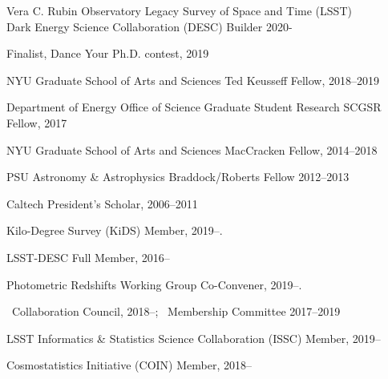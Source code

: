 \documentclass[12pt,letterpaper]{article}
\begin{document}
\begin{list}{}{\malzlist}
\item Vera C. Rubin Observatory Legacy Survey of Space and Time (LSST)\\ Dark Energy Science Collaboration (DESC) Builder 2020-
\item Finalist, Dance Your Ph.D. contest, 2019
\item
NYU Graduate School of Arts and Sciences Ted Keusseff Fellow, 2018--2019
\item
Department of Energy Office of Science Graduate Student Research SCGSR Fellow, 2017
\item
NYU Graduate School of Arts and Sciences MacCracken Fellow, 2014--2018
\item
PSU Astronomy \& Astrophysics Braddock/Roberts Fellow 2012--2013
\item
Caltech President's Scholar, 2006--2011
\end{list}

\begin{list}{}{\malzlist}
	\item Kilo-Degree Survey (KiDS) Member, 2019--.
	\item LSST-DESC Full Member, 2016--\\
	\begin{list}{}{\malzlist}
		\item Photometric Redshifts Working Group Co-Convener, 2019--.
		\item \past\ Collaboration Council, 2018--; \past\ Membership Committee 2017--2019
	\end{list}
	\item LSST Informatics \& Statistics Science Collaboration (ISSC) Member, 2019--
	\item Cosmostatistics Initiative (COIN) Member, 2018--
\end{list}
\end{document}
